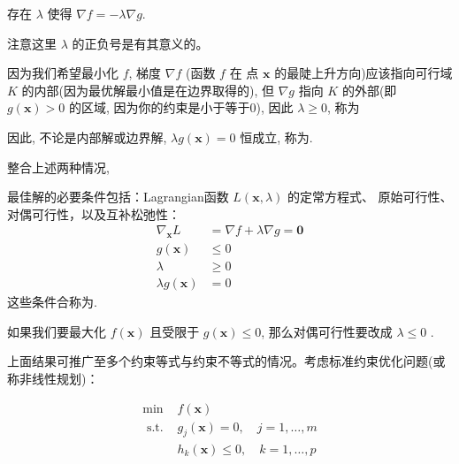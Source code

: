 \begin{corollary}
    存在 $\lambda$ 使得 $\nabla f=-\lambda \nabla g$.

    注意这里 $\lambda$ 的正负号是有其意义的。
\end{corollary}

因为我们希望最小化 $f$, 梯度 $\nabla f$ (函数 $f$ 在 点 $\mathbf{x}$ 的最陡上升方向)应该指向可行域 $K$ 的内部(因为最优解最小值是在边界取得的), 但 $\nabla g$ 指向 $K$ 的外部(即 $g(\mathbf{x})>0$ 的区域, 因为你的约束是小于等于0), 因此 $\lambda \geq 0$, 称为

因此, 不论是内部解或边界解, $\lambda g(\mathbf{x})=0$ 恒成立, 称为.

整合上述两种情况, 

\begin{theorem}
    最佳解的必要条件包括：Lagrangian函数 $L(\mathbf{x}, \lambda)$ 的定常方程式、 原始可行性、对偶可行性，以及互补松弛性：
$$
\begin{aligned}
\nabla_{\mathbf{x}} L &=\nabla f+\lambda \nabla g=\mathbf{0} \\
g(\mathbf{x}) & \leq 0 \\
\lambda & \geq 0 \\
\lambda g(\mathbf{x}) &=0
\end{aligned}
$$
这些条件合称为.

如果我们要最大化 $f(\mathbf{x})$ 且受限于 $g(\mathbf{x}) \leq 0$, 那么对偶可行性要改成 $\lambda \leq 0$ .
\end{theorem}


上面结果可推广至多个约束等式与约束不等式的情况。考虑标准约束优化问题(或称非线性规划)：

\begin{definition}
    $$
\begin{array}{ll}
\min & f(\mathbf{x}) \\
\text { s.t. } & g_{j}(\mathbf{x})=0, \quad j=1, \ldots, m \\
& h_{k}(\mathbf{x}) \leq 0, \quad k=1, \ldots, p
\end{array}
$$
\end{definition}

